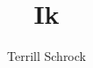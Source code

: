 \author{Terrill Schrock}
\title{Ik}
\subtitle{}
\renewcommand{\lsSeries}{algad}
\renewcommand{\lsSeriesNumber}{2}

